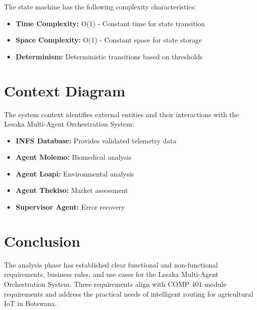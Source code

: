 The state machine has the following complexity characteristics:

\begin{itemize}
    \item \textbf{Time Complexity:} O(1) - Constant time for state transition
    \item \textbf{Space Complexity:} O(1) - Constant space for state storage
    \item \textbf{Determinism:} Deterministic transitions based on thresholds
\end{itemize}

\section{Context Diagram}

The system context identifies external entities and their interactions with the Lesaka Multi-Agent Orchestration System:

\begin{itemize}
    \item \textbf{INFS Database:} Provides validated telemetry data
    \item \textbf{Agent Molemo:} Biomedical analysis
    \item \textbf{Agent Loapi:} Environmental analysis
    \item \textbf{Agent Thekiso:} Market assessment
    \item \textbf{Supervisor Agent:} Error recovery
\end{itemize}

\section{Conclusion}

The analysis phase has established clear functional and non-functional requirements, business rules, and use cases for the Lesaka Multi-Agent Orchestration System. These requirements align with COMP 401 module requirements and address the practical needs of intelligent routing for agricultural IoT in Botswana.
